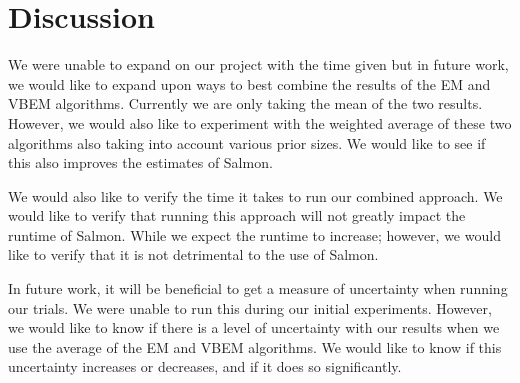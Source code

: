 \section{Discussion}

We were unable to expand on our project with the time given but in future work, we would like to expand upon ways to best combine the results of the EM and VBEM algorithms. Currently we are only taking the mean of the two results. However, we would also like to experiment with the weighted average of these two algorithms also taking into account various prior sizes. We would like to see if this also improves the estimates of Salmon. 

We would also like to verify the time it takes to run our combined approach. We would like to verify that running this approach will not greatly impact the runtime of Salmon. While we expect the runtime to increase; however, we would like to verify that it is not detrimental to the use of Salmon. 

In future work, it will be beneficial to get a measure of uncertainty when running our trials. We were unable to run this during our initial experiments. However, we would like to know if there is a level of uncertainty with our results when we use the average of the EM and VBEM algorithms. We would like to know if this uncertainty increases or decreases, and if it does so significantly. 
